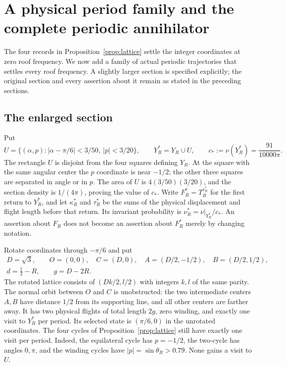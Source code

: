 \section{A physical period family and the complete periodic annihilator}
\label{sec:joint-arithmetic}
The four records in Proposition~\ref{prop:lattice} settle the integer
coordinates at zero roof frequency. We now add a family of actual periodic
trajectories that settles every roof frequency. A slightly larger section is
specified explicitly; the original section and every assertion about it
remain as stated in the preceding sections.

\subsection{The enlarged section}
Put
\begin{equation}\label{eq:enlarged-section}
 U=\{(\alpha,p):|\alpha-\pi/6|<3/50,\ |p|<3/20\},
 \qquad Y_R^*=Y_R\cup U,\qquad c_*:=\nu(Y_R^*)=\frac{91}{10000\pi}.
\end{equation}
The rectangle $U$ is disjoint from the four squares defining $Y_R$.
At the square with the same angular center the $p$ coordinate is near
$-1/2$; the other three squares are separated in angle or in $p$.
The area of $U$ is $4(3/50)(3/20)$, and the section density is
$1/(4\pi)$, proving the value of $c_*$. Write
$F_R^*=T_R^{r_R^*}$ for the first return to $Y_R^*$, and let
$\kappa_R^*$ and $\tau_R^*$ be the sums of the physical displacement
and flight length before that return. Its invariant probability is
$\nu_R^*=\nu|_{Y_R^*}/c_*$. An assertion about $F_R$ does not become
an assertion about $F_R^*$ merely by changing notation.

Rotate coordinates through $-\pi/6$ and put
\begin{gather*}
 D=\sqrt3,\qquad O=(0,0),\quad C=(D,0),\quad
 A=(D/2,-1/2),\quad B=(D/2,1/2),\\
 d=\frac12-R,\qquad g=D-2R.
\end{gather*}
The rotated lattice consists of $(Dk/2,l/2)$ with integers $k,l$ of
the same parity. The normal orbit between $O$ and $C$ is unobstructed:
the two intermediate centers $A,B$ have distance $1/2$ from its
supporting line, and all other centers are farther away. It has two
physical flights of total length $2g$, zero winding, and exactly one
visit to $Y_R^*$ per period. Its selected state is $(\pi/6,0)$ in the
unrotated coordinates. The four cycles of Proposition~\ref{prop:lattice}
still have exactly one visit per period. Indeed, the equilateral cycle
has $p=-1/2$, the two-cycle has angles $0,\pi$, and the winding cycles
have $|p|=\sin\theta_R>0.79$. None gains a visit to $U$.


